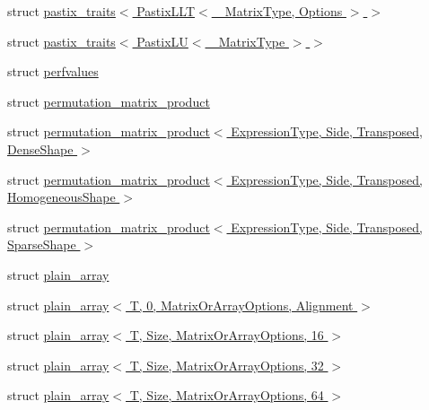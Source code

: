 \begin{DoxyCompactItemize}
\item 
struct \hyperlink{struct_eigen_1_1internal_1_1pastix__traits_3_01_pastix_l_l_t_3_01___matrix_type_00_01_options_01_4_01_4}{pastix\+\_\+traits$<$ Pastix\+L\+L\+T$<$ \+\_\+\+Matrix\+Type, Options $>$ $>$}
\item 
struct \hyperlink{struct_eigen_1_1internal_1_1pastix__traits_3_01_pastix_l_u_3_01___matrix_type_01_4_01_4}{pastix\+\_\+traits$<$ Pastix\+L\+U$<$ \+\_\+\+Matrix\+Type $>$ $>$}
\item 
struct \hyperlink{struct_eigen_1_1internal_1_1perfvalues}{perfvalues}
\item 
struct \hyperlink{struct_eigen_1_1internal_1_1permutation__matrix__product}{permutation\+\_\+matrix\+\_\+product}
\item 
struct \hyperlink{struct_eigen_1_1internal_1_1permutation__matrix__product_3_01_expression_type_00_01_side_00_01_t00744509fe9d67128974220180aea840}{permutation\+\_\+matrix\+\_\+product$<$ Expression\+Type, Side, Transposed, Dense\+Shape $>$}
\item 
struct \hyperlink{struct_eigen_1_1internal_1_1permutation__matrix__product_3_01_expression_type_00_01_side_00_01_t6e72df7be1755279b5abe7eabbb39875}{permutation\+\_\+matrix\+\_\+product$<$ Expression\+Type, Side, Transposed, Homogeneous\+Shape $>$}
\item 
struct \hyperlink{struct_eigen_1_1internal_1_1permutation__matrix__product_3_01_expression_type_00_01_side_00_01_t20ccd76e9ac5a7579d51cf9e9a5cbb67}{permutation\+\_\+matrix\+\_\+product$<$ Expression\+Type, Side, Transposed, Sparse\+Shape $>$}
\item 
struct \hyperlink{struct_eigen_1_1internal_1_1plain__array}{plain\+\_\+array}
\item 
struct \hyperlink{struct_eigen_1_1internal_1_1plain__array_3_01_t_00_010_00_01_matrix_or_array_options_00_01_alignment_01_4}{plain\+\_\+array$<$ T, 0, Matrix\+Or\+Array\+Options, Alignment $>$}
\item 
struct \hyperlink{struct_eigen_1_1internal_1_1plain__array_3_01_t_00_01_size_00_01_matrix_or_array_options_00_0116_01_4}{plain\+\_\+array$<$ T, Size, Matrix\+Or\+Array\+Options, 16 $>$}
\item 
struct \hyperlink{struct_eigen_1_1internal_1_1plain__array_3_01_t_00_01_size_00_01_matrix_or_array_options_00_0132_01_4}{plain\+\_\+array$<$ T, Size, Matrix\+Or\+Array\+Options, 32 $>$}
\item 
struct \hyperlink{struct_eigen_1_1internal_1_1plain__array_3_01_t_00_01_size_00_01_matrix_or_array_options_00_0164_01_4}{plain\+\_\+array$<$ T, Size, Matrix\+Or\+Array\+Options, 64 $>$}

\end{DoxyCompactItemize}

